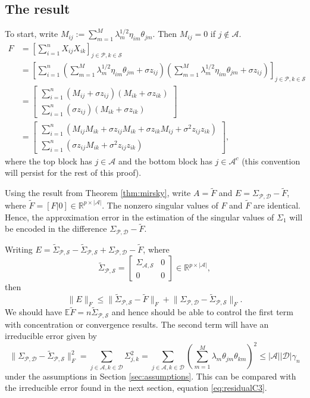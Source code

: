 \documentclass[11pt]{article}
\newcommand{\E}{\mathbb{E}}
\newcommand{\R}{\mathbb{R}}
\newcommand{\norm}[1]{\lVert #1 \rVert}
\newcommand{\A}{\mathcal{A}}
\renewcommand{\S}{\mathcal{S}}
\newcommand{\D}{\mathcal{D}}
\newcommand{\PP}{\mathcal{P}}
\begin{document}
\subsection{The result}
To start, write $M_{ij} :=  \sum_{m=1}^M \lambda_m^{1/2}\eta_{im} \theta_{jm}$.  Then $M_{ij} = 0$ if $j \notin \A$.
\begin{align}
F & = \left[\sum_{i=1}^n X_{ij} X_{ik}\right]_{j \in \PP, k \in \S}\\
& = \left[\sum_{i=1}^n(\sum_{m=1}^M \lambda_m^{1/2}\eta_{im} \theta_{jm} + \sigma z_{ij})
(\sum_{m=1}^M \lambda_m^{1/2}\eta_{im} \theta_{jm} + \sigma z_{ij})\right]_{j \in \PP, k \in \S} \\
& = 
\begin{bmatrix}
\sum_{i=1}^n(M_{ij} + \sigma z_{ij})(M_{ik} + \sigma z_{ik})\\
\sum_{i=1}^n(\sigma z_{ij})(M_{ik} + \sigma z_{ik})
\end{bmatrix} \\
& 
=
\begin{bmatrix}
\sum_{i=1}^n(M_{ij}M_{ik}+ \sigma z_{ij}M_{ik} + \sigma z_{ik}M_{ij} +  \sigma^2 z_{ij}z_{ik})\\
\sum_{i=1}^n( \sigma z_{ij}M_{ik} +  \sigma^2 z_{ij}z_{ik})
\end{bmatrix},
\end{align}
where the top block has $j \in \A$ and the bottom block has $j \in \A^c$ (this convention will persist for the rest of this proof).

Using the result from Theorem \ref{thm:mirsky}, write 
$A = \tilde{F}$  and $E = \Sigma_{\PP,\D} - \tilde{F}$, where $\tilde{F} = [F |  0] \in \R^{p \times |\A|}$.
The nonzero singular values of $F$ and $\tilde{F}$ are identical. 
 Hence, the approximation error in the estimation of the singular values of $\Sigma_1$  will be encoded
 in the difference $\Sigma_{\PP,\D} - \tilde{F}$.

Writing 
 $E = \tilde{\Sigma}_{\PP,\S} - \tilde{\Sigma}_{\PP,\S} + \Sigma_{\PP,\D} - \tilde{F}$, 
where 
\begin{equation}
\tilde{\Sigma}_{\PP,\S} 
= 
\begin{bmatrix} 
\Sigma_{\A,\S} & 0 \\
0 & 0
\end{bmatrix}
\in
\R^{p \times |\A|},
\end{equation}  
then
\begin{equation}
\norm{E}_F \leq \norm{\tilde{\Sigma}_{\PP,\S} - \tilde{F}}_F  + \norm{\Sigma_{\PP,\D} - \tilde{\Sigma}_{\PP,\S}}_F.
\end{equation}
We should have $\E \tilde{F} = n \tilde{\Sigma}_{\PP,\S}$ and hence should be able to control the first term with concentration or
convergence results.  The second term will have an irreducible error given by
\begin{equation}
\norm{\Sigma_{\PP,\D} - \tilde{\Sigma}_{\PP,\S}}_F^2
= 
\sum_{j \in \A, k \in \D} \Sigma_{j,k}^2
= 
 \sum_{j \in \A, k \in \D}\left( \sum_{m=1}^M \lambda_m \theta_{jm}\theta_{km}\right)^2
 \leq
 |\A| |\D| \gamma_n
\end{equation}
under the assumptions in Section \ref{sec:assumptions}. This can be compared with the irreducible error found in the next
section, equation \eqref{eq:residualC3}.
\end{document}

